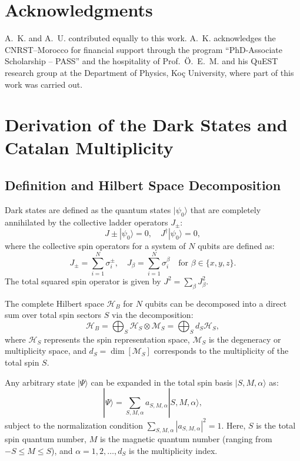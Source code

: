 \documentclass[aps,superscriptaddress,twocolumn,pre,longbibliography,floatfix]{revtex4-1}
\begin{document}
	\section*{Acknowledgments}
	A.~K. and A.~U. contributed equally to this work.
	A.~K. acknowledges the CNRST–Morocco for financial support through the program ``PhD-Associate Scholarship – PASS'' and the hospitality of Prof.~Ö.~E.~M. and his QuEST research group at the Department of Physics, Koç University, where part of this work was carried out.
	
	
	
	\appendix
	\section{Derivation of the Dark States and Catalan Multiplicity}
	\subsection{Definition and Hilbert Space Decomposition}
	
	Dark states are defined as the quantum states $|\psi_0\rangle$ that are completely annihilated by the collective ladder operators $J_{\pm}$:
	\begin{equation}
		J{\pm} |\psi_0\rangle = 0, \quad J^\dagger |\psi_0\rangle = 0,
	\end{equation}
	where the collective spin operators for a system of $N$ qubits are defined as:
	\begin{equation}
		J_{\pm} = \sum_{i=1}^{N} \sigma_{i}^{\pm}, \quad J_{\beta} = \sum_{i=1}^{N} \sigma_{i}^{\beta} \quad \text{for } \beta \in \{x,y,z\}.
	\end{equation}
	The total squared spin operator is given by $J^2 = \sum_{\beta} J_{\beta}^2$. 
	
	The complete Hilbert space $\mathcal{H}_B$ for $N$ qubits can be decomposed into a direct sum over total spin sectors $S$ via the decomposition:
	\begin{equation}\label{DEC_Hilbert}
		\mathcal{H}_B = \bigoplus_{S} \mathcal{H}_S \otimes \mathcal{M}_S = \bigoplus_{S} d_S \mathcal{H}_S,
	\end{equation}
	where $\mathcal{H}_S$ represents the spin representation space, $\mathcal{M}_S$ is the degeneracy or multiplicity space, and $d_S = \dim[\mathcal{M}_S]$ corresponds to the multiplicity of the total spin $S$.
	
	Any arbitrary state $|\Psi\rangle$ can be expanded in the total spin basis $|S, M, \alpha\rangle$ as:
	\begin{equation}\label{anypsi}
		|\Psi\rangle = \sum_{S, M, \alpha} a_{S,M,\alpha} |S, M, \alpha\rangle,
	\end{equation}
	subject to the normalization condition $\sum_{S,M,\alpha} |a_{S,M,\alpha}|^2 = 1$. Here, $S$ is the total spin quantum number, $M$ is the magnetic quantum number (ranging from $-S \leq M \leq S$), and $\alpha = 1, 2, \dots, d_S$ is the multiplicity index. 
	
\end{document}
